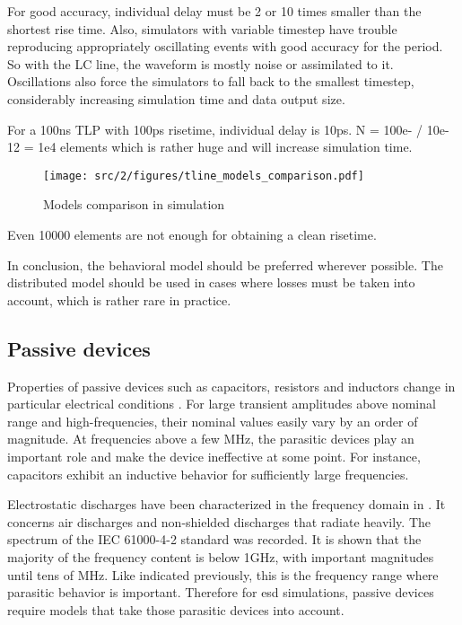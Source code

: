 For good accuracy, individual delay must be 2 or 10 times smaller than the shortest rise time.
Also, simulators with variable timestep have trouble reproducing appropriately oscillating events with good accuracy for the period.
So with the LC line, the waveform is mostly noise or assimilated to it.
Oscillations also force the simulators to fall back to the smallest timestep, considerably increasing simulation time and data output size.

For a 100ns TLP with 100ps risetime, individual delay is 10ps.
N = 100e- / 10e-12 = 1e4 elements which is rather huge and will increase simulation time.

\begin{figure}[!h]
  \centering
  \texttt{[image: src/2/figures/tline\_models\_comparison.pdf]}
  \caption{Models comparison in simulation}
  \label{fig:lines-simulations}
\end{figure}

Even 10000 elements are not enough for obtaining a clean risetime.


In conclusion, the behavioral model should be preferred wherever possible.
The distributed model should be used in cases where losses must be taken into account, which is rather rare in practice.

\subsection{Passive devices}

Properties of passive devices such as capacitors, resistors and inductors change in particular electrical conditions \cite{capa-esd-cz}.
For large transient amplitudes above nominal range and high-frequencies, their nominal values easily vary by an order of magnitude.
At frequencies above a few MHz, the parasitic devices play an important role and make the device ineffective at some point.
For instance, capacitors exhibit an inductive behavior for sufficiently large frequencies.

Electrostatic discharges have been characterized in the frequency domain in \cite{fft-esd}.
It concerns air discharges and non-shielded discharges that radiate heavily.
The spectrum of the IEC 61000-4-2 standard \cite{iec61000-4-2} was recorded.
It is shown that the majority of the frequency content is below 1GHz, with important magnitudes until tens of MHz.
Like indicated previously, this is the frequency range where parasitic behavior is important.
Therefore for \gls{esd} simulations, passive devices require models that take those parasitic devices into account.


